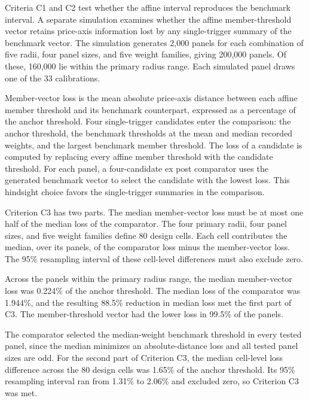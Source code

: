 \documentclass[5p,times,authoryear]{elsarticle}
\theoremstyle{plain}
\begin{document}
Criteria C1 and C2 test whether the affine interval reproduces the benchmark interval. A separate simulation examines whether the affine member-threshold vector retains price-axis information lost by any single-trigger summary of the benchmark vector. The simulation generates 2,000 panels for each combination of five radii, four panel sizes, and five weight families, giving 200,000 panels. Of these, 160,000 lie within the primary radius range. Each simulated panel draws one of the 33 calibrations.

Member-vector loss is the mean absolute price-axis distance between each affine member threshold and its benchmark counterpart, expressed as a percentage of the anchor threshold. Four single-trigger candidates enter the comparison: the anchor threshold, the benchmark thresholds at the mean and median recorded weights, and the largest benchmark member threshold. The loss of a candidate is computed by replacing every affine member threshold with the candidate threshold. For each panel, a four-candidate ex post comparator uses the generated benchmark vector to select the candidate with the lowest loss. This hindsight choice favors the single-trigger summaries in the comparison.

Criterion C3 has two parts. The median member-vector loss must be at most one half of the median loss of the comparator. The four primary radii, four panel sizes, and five weight families define 80 design cells. Each cell contributes the median, over its panels, of the comparator loss minus the member-vector loss. The 95\% resampling interval of these cell-level differences must also exclude zero.

Across the panels within the primary radius range, the median member-vector loss was 0.224\% of the anchor threshold. The median loss of the comparator was 1.944\%, and the resulting 88.5\% reduction in median loss met the first part of C3. The member-threshold vector had the lower loss in 99.5\% of the panels.

The comparator selected the median-weight benchmark threshold in every tested panel, since the median minimizes an absolute-distance loss and all tested panel sizes are odd. For the second part of Criterion C3, the median cell-level loss difference across the 80 design cells was 1.65\% of the anchor threshold. Its 95\% resampling interval ran from 1.31\% to 2.06\% and excluded zero, so Criterion C3 was met.
\end{document}
